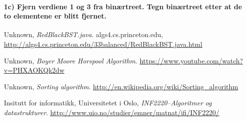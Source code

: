 \documentclass[11pt,a4paper]{article}
\theoremstyle{def}
\begin{document}
\paragraph{1c) Fjern verdiene 1 og 3 fra binærtreet. Tegn binærtreet etter at de to elementene er blitt fjernet.}
\begin{center}
\end{center}



\newpage

\begin{thebibliography}{}

  Unknown,
  \emph{RedBlackBST.java}.
  algs4.cs.princeton.edu,
  \url{http://algs4.cs.princeton.edu/33balanced/RedBlackBST.java.html}

  Unknown,
  \emph{Boyer Moore Horspool Algorithm}.
  \url{https://www.youtube.com/watch?v=PHXAOKQk2dw}

  Unknown,
  \emph{Sorting algorithm}.
  \url{http://en.wikipedia.org/wiki/Sorting_algorithm}

 Insitutt for informatikk, Universitetet i Oslo,
  \emph{INF2220--Algoritmer og datastrukturer}.
  \url{http://www.uio.no/studier/emner/matnat/ifi/INF2220/}



\end{thebibliography}
\end{document}
